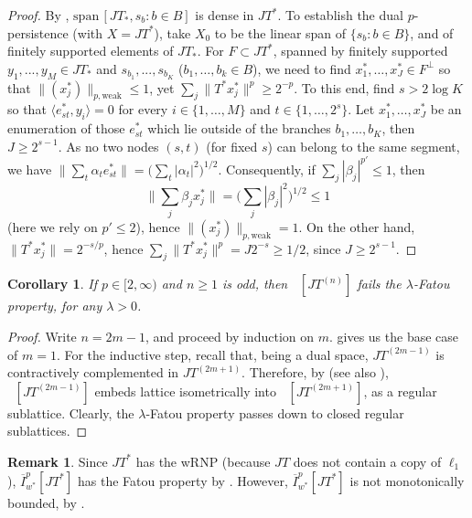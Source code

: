 \documentclass{amsart}
\theoremstyle{plain}
\newtheorem{corollary}[theorem]{Corollary}
\theoremstyle{definition}
\newtheorem{remark}[theorem]{Remark}
\numberwithin{equation}{section}
\newcommand{\spn}{\textrm{span}\,}
\DeclareMathOperator{\FBLp}{FBL^{\mathit{(p)}}}
\newcommand{\Ip}{\overline{I}_{w^*}^{p}}
\begin{document}
\begin{proof}
By \cite{AGM}, $\spn[JT_* , s_b : b \in B]$ is dense in $JT^*$. To establish the dual $p$-persistence (with $X = JT^*$), take $X_0$ to be the linear span of $\{s_b : b \in B\}$, and of finitely supported elements of $JT_*$.
For $F \subset JT^*$, spanned by finitely supported $y_1, ..., y_M \in JT_*$ and $s_{b_1}, ..., s_{b_K}$ ($b_1, \ldots, b_k \in B$), we need to find $x_1^*, \ldots, x_J^* \in F^\perp$ so that $\|(x_j^*)\|_{p,\textrm{weak}} \leq 1$, yet $\sum_j \|T^* x_j^*\|^p \geq 2^{-p}$.
To this end, find $s > 2 \log K$ so that $\langle e_{st}^*, y_i \rangle = 0$ for every $i \in \{1, \ldots, M\}$ and $t \in \{1, \ldots, 2^s\}$.
Let $x_1^*, \ldots, x_J^*$ be an enumeration of those $e_{st}^*$ which lie outside of the branches $b_1, \ldots, b_K$, then $J \geq 2^{s-1}$.
As no two nodes $(s,t)$ (for fixed $s$) can belong to the same segment, we have
$\| \sum_t \alpha_t e^*_{st} \big\| = \big( \sum_t |\alpha_t|^2 \big)^{1/2}$.
Consequently, if $\sum_j |\beta_j|^{p'} \leq 1$, then
$$
\| \sum_j \beta_j x_j^* \| = \big( \sum_j |\beta_j|^2 \big)^{1/2} \leq 1 
$$
(here we rely on $p' \leq 2$), hence $\| (x_j^* )\|_{p, {\textrm{weak}}} = 1$. On the other hand, $\|T^* x_j^*\| = 2^{-s/p}$, hence $\sum_j \|T^* x_j^*\|^p = J 2^{-s} \geq 1/2$, since $J \geq 2^{s-1}$.
\end{proof}

\begin{corollary}
 If $p \in [2, \infty)$ and $n \geq 1$ is odd, then $\FBLp[JT^{(n)}]$ fails the $\lambda$-Fatou property, for any $\lambda > 0$.
\end{corollary}

\begin{proof}
 Write $n = 2m-1$, and proceed by induction on $m$.  gives us the base case of $m = 1$. For the inductive step, recall that, being a dual space, $JT^{(2m - 1)}$ is contractively complemented in $JT^{(2m + 1)}$. 
 Therefore, by \cite{OiTTT} (see also \cite{OiTTT-cor}), $\FBLp[JT^{(2m - 1)}]$ embeds lattice isometrically into $\FBLp[JT^{(2m + 1)}]$, as a regular sublattice. Clearly, the $\lambda$-Fatou property passes down to closed regular sublattices.
\end{proof}

\begin{remark}
    Since $JT^*$ has the wRNP (because $JT$ does not contain a copy of $\ell_1$), $\Ip[JT^*]$ has the Fatou property by . However, $\Ip[JT^*]$ is not monotonically bounded, by .
\end{remark}
\end{document}
